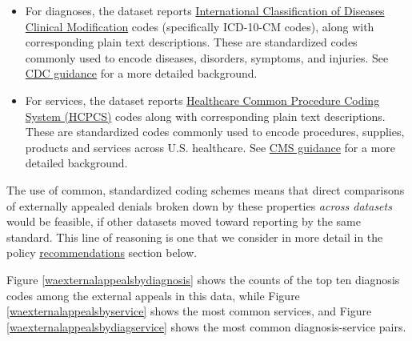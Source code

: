 \documentclass[12pt, a4paper,twoside,parskip=full]{report}
\theoremstyle{plain} %
\theoremstyle{definition} %
\theoremstyle{remark} %
\numberwithin{equation}{chapter}
\begin{document}
		\begin{itemize}
			\item For diagnoses, the dataset reports \href{https://en.wikipedia.org/wiki/ICD-10-CM}{International Classification of Diseases Clinical Modification} codes (specifically ICD-10-CM codes), along with corresponding plain text descriptions. These are standardized codes commonly used to encode diseases, disorders, symptoms, and injuries. See \href{https://www.cdc.gov/nchs/icd/icd-10-cm.htm}{CDC guidance} for a more detailed background.
			
			\item For services, the dataset reports \href{https://en.wikipedia.org/wiki/Healthcare_Common_Procedure_Coding_System}{Healthcare Common Procedure Coding System (HCPCS)} codes along with corresponding plain text descriptions. These are standardized codes commonly used to encode procedures, supplies, products and services across U.S. healthcare. See \href{https://www.cms.gov/medicare/fraud-and-abuse/physicianselfreferral/list_of_codes}{CMS guidance} for a more detailed background.
		\end{itemize}
	
		The use of common, standardized coding schemes means that direct comparisons of externally appealed denials broken down by these properties \emph{across datasets} would be feasible, if other datasets moved toward reporting by the same standard. This line of reasoning is one that we consider in more detail in the policy \hyperref[recommendations]{recommendations} section below.
		
		Figure \ref{waexternalappealsbydiagnosis} shows the counts of the top ten diagnosis codes among the external appeals in this data, while Figure \ref{waexternalappealsbyservice} shows the most common services, and Figure \ref{waexternalappealsbydiagservice} shows the most common diagnosis-service pairs.
		
\end{document}

